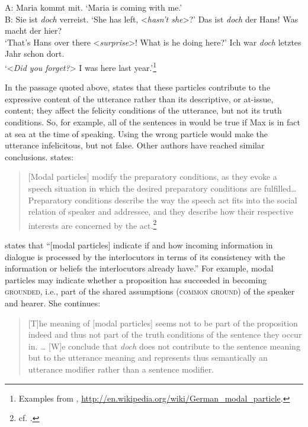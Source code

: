 \ea \label{ex:11.27} \ea  A: Maria kommt mit. ‘Maria is coming with me.’\\
    B: Sie ist \textit{doch} verreist. ‘She has left, <\textit{hasn’t she}>?’
\ex  Das ist \textit{doch} der Hans! Was macht der hier?\\
‘That’s Hans over there <\textit{surprise}>! What is he doing here?’
\ex Ich war \textit{doch} letztes Jahr schon dort.\\
‘<\textit{Did you forget?}> I was here last year.’\footnote{Examples from \citet{Karagjosova2000,Grosz2010}, \url{http://en.wikipedia.org/wiki/German_modal_particle}.}
\z \z 


In the passage quoted above, \citet{Zimmermann2011} states that these particles contribute to the expressive content of the utterance rather than its descriptive, or at-issue, content; they affect the felicity conditions of the utterance, but not its truth conditions. So, for example, all of the sentences in  would be true if Max is in fact at sea at the time of speaking. Using the wrong particle would make the utterance infelicitous, but not false. Other authors have reached similar conclusions. \citet{Waltereit2001} states:


\begin{quote}
{}[Modal particles] modify the preparatory conditions, as they evoke a speech situation in which the desired preparatory conditions are fulfilled… Preparatory conditions describe the way the speech act fits into the social relation of speaker and addressee, and they describe how their respective interests are concerned by the act.\footnote{cf. \citet{Searle1969}.}
\end{quote}


\citet{Karagjosova2000} states that “[modal particles] indicate if and how incoming information in dialogue is processed by the interlocutors in terms of its consistency with the information or beliefs the interlocutors already have.” For example, modal particles may indicate whether a proposition has succeeded in becoming \textsc{grounded}, i.e., part of the shared assumptions (\textsc{common ground}) of the speaker and hearer. She continues:


\begin{quote}
{}[T]he meaning of [modal particles] seems not to be part of the proposition indeed and thus not part of the truth conditions of the sentence they occur in. …  [W]e conclude that \textit{doch} does not contribute to the sentence meaning but to the utterance meaning and represents thus semantically an utterance modifier rather than a sentence modifier.
\end{quote}


